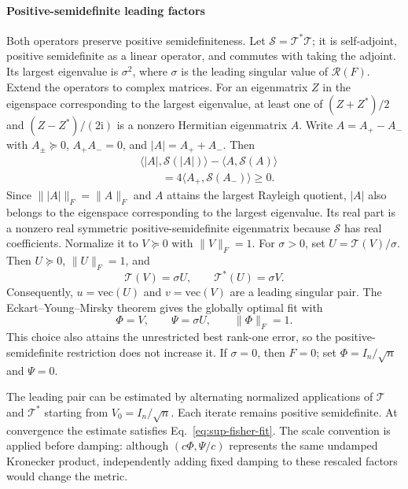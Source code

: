 \paragraph{Positive-semidefinite leading factors}
Both operators preserve positive semidefiniteness. Let $\mathcal S=\mathcal T^*\mathcal T$; it is self-adjoint, positive semidefinite as a linear operator, and commutes with taking the adjoint. Its largest eigenvalue is $\sigma^2$, where $\sigma$ is the leading singular value of $\mathcal R(F)$. Extend the operators to complex matrices. For an eigenmatrix $Z$ in the eigenspace corresponding to the largest eigenvalue, at least one of $(Z+Z^*)/2$ and $(Z-Z^*)/(2\mathrm i)$ is a nonzero Hermitian eigenmatrix $A$. Write $A=A_+-A_-$ with $A_\pm\succeq0$, $A_+A_-=0$, and $|A|=A_++A_-$. Then
\begin{equation}
\begin{aligned}
&\langle|A|,\mathcal S(|A|)\rangle
-\langle A,\mathcal S(A)\rangle\\
&\qquad=4\langle A_+,\mathcal S(A_-)\rangle\ge0.
\end{aligned}
\end{equation}
Since $\||A|\|_F=\|A\|_F$ and $A$ attains the largest Rayleigh quotient, $|A|$ also belongs to the eigenspace corresponding to the largest eigenvalue. Its real part is a nonzero real symmetric positive-semidefinite eigenmatrix because $\mathcal S$ has real coefficients. Normalize it to $V\succeq0$ with $\|V\|_F=1$. For $\sigma>0$, set $U=\mathcal T(V)/\sigma$. Then $U\succeq0$, $\|U\|_F=1$, and
\begin{equation}
\mathcal T(V)=\sigma U,\qquad
\mathcal T^*(U)=\sigma V.
\end{equation}
Consequently, $u=\mathrm{vec}(U)$ and $v=\mathrm{vec}(V)$ are a leading singular pair. The Eckart--Young--Mirsky theorem gives the globally optimal fit with
\begin{equation}
\Phi=V,\qquad\Psi=\sigma U,\qquad\|\Phi\|_F=1.
\label{eq:sup-fisher-fit}
\end{equation}
This choice also attains the unrestricted best rank-one error, so the positive-semidefinite restriction does not increase it. If $\sigma=0$, then $F=0$; set $\Phi=I_n/\sqrt n$ and $\Psi=0$.

The leading pair can be estimated by alternating normalized applications of $\mathcal T$ and $\mathcal T^*$ starting from $V_0=I_n/\sqrt n$. Each iterate remains positive semidefinite. At convergence the estimate satisfies Eq.~\eqref{eq:sup-fisher-fit}. The scale convention is applied before damping: although $(c\Phi,\Psi/c)$ represents the same undamped Kronecker product, independently adding fixed damping to these rescaled factors would change the metric.

